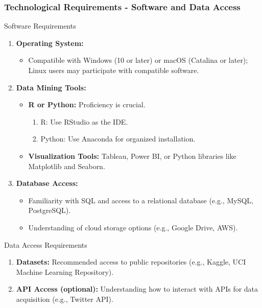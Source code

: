 \documentclass[aspectratio=169]{beamer}
\begin{document}
\begin{frame}[fragile]
    \frametitle{Technological Requirements - Software and Data Access}
    \begin{block}{Software Requirements}
        \begin{enumerate}
            \item \textbf{Operating System:}
            \begin{itemize}
                \item Compatible with Windows (10 or later) or macOS (Catalina or later); Linux users may participate with compatible software.
            \end{itemize}
            \item \textbf{Data Mining Tools:}
            \begin{itemize}
                \item \textbf{R or Python:} Proficiency is crucial.
                \begin{enumerate}
                    \item R: Use RStudio as the IDE.
                    \item Python: Use Anaconda for organized installation.
                \end{enumerate}
                \item \textbf{Visualization Tools:} Tableau, Power BI, or Python libraries like Matplotlib and Seaborn.
            \end{itemize}
            \item \textbf{Database Access:}
            \begin{itemize}
                \item Familiarity with SQL and access to a relational database (e.g., MySQL, PostgreSQL).
                \item Understanding of cloud storage options (e.g., Google Drive, AWS).
            \end{itemize}
        \end{enumerate}
    \end{block}
    
    \begin{block}{Data Access Requirements}
        \begin{enumerate}
            \item \textbf{Datasets:} Recommended access to public repositories (e.g., Kaggle, UCI Machine Learning Repository).
            \item \textbf{API Access (optional):} Understanding how to interact with APIs for data acquisition (e.g., Twitter API).
        \end{enumerate}
    \end{block}
\end{frame}
\end{document}
